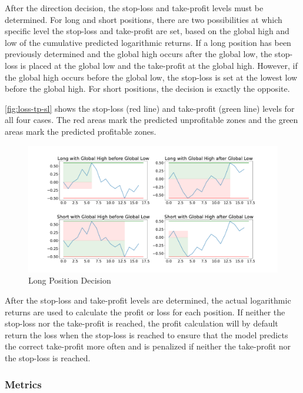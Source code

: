 \noindent
After the direction decision, the stop-loss and take-profit levels must be determined.
For long and short positions, there are two possibilities at which specific level the stop-loss and take-profit are set, based on the global high and low of the cumulative predicted logarithmic returns.
If a long position has been previously determined and the global high occurs after the global low, the stop-loss is placed at the global low and the take-profit at the global high.
However, if the global high occurs before the global low, the stop-loss is set at the lowest low before the global high.
For short positions, the decision is exactly the opposite.

\autoref{fig:loss-tp-sl} shows the stop-loss (red line) and take-profit (green line) levels for all four cases.
The red areas mark the predicted unprofitable zones and the green areas mark the predicted profitable zones.

\begin{figure}[H]
    \centering
    \includegraphics[width=\textwidth]{images/models/loss_tp_sl}
    \caption{Long Position Decision}
    \label{fig:loss-tp-sl}
\end{figure}

\noindent
After the stop-loss and take-profit levels are determined, the actual logarithmic returns are used to calculate the profit or loss for each position.
If neither the stop-loss nor the take-profit is reached, the profit calculation will by default return the loss when the stop-loss is reached to ensure that the model predicts the correct take-profit more often and is penalized if neither the take-profit nor the stop-loss is reached.

\subsubsection{Metrics}

